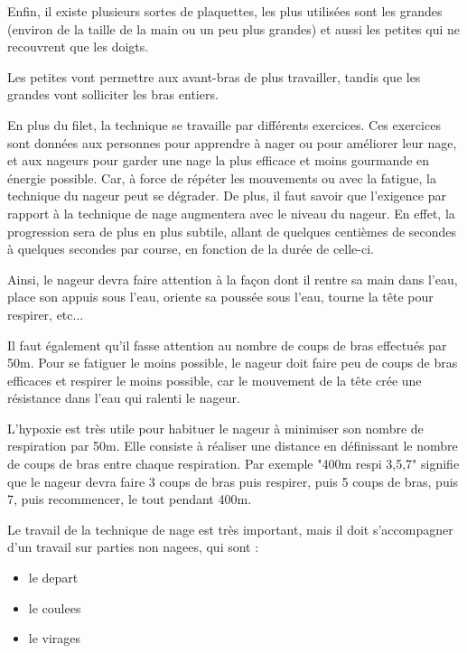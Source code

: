 \vspace{12pt}

Enfin, il existe plusieurs sortes de plaquettes, les plus utilisées sont les grandes (environ de la taille de la main ou un peu plus grandes) et aussi les petites qui ne recouvrent que les doigts.

Les petites vont permettre aux avant-bras de plus travailler, tandis que les grandes vont solliciter les bras entiers.

\vspace{12pt}

En plus du \gls{filet}, la technique se travaille par différents exercices. Ces exercices sont données aux personnes pour apprendre à nager ou pour améliorer leur nage, et aux nageurs pour garder une nage la plus efficace et moins gourmande en énergie possible. Car, à force de répéter les mouvements ou avec la fatigue, la technique du nageur peut se dégrader. De plus, il faut savoir que l'exigence par rapport à la technique de nage augmentera avec le niveau du nageur. En effet, la progression sera de plus en plus subtile, allant de quelques centièmes de secondes à quelques secondes par course, en fonction de la durée de celle-ci.

Ainsi, le nageur devra faire attention à la façon dont il rentre sa main dans l'eau, place son appuis sous l'eau, oriente sa poussée sous l'eau, tourne la tête pour respirer, etc...

Il faut également qu'il fasse attention au nombre de coups de bras effectués par 50m. Pour se fatiguer le moins possible, le nageur doit faire peu de coups de bras efficaces et respirer le moins possible, car le mouvement de la tête crée une résistance dans l'eau qui ralenti le nageur.

\vspace{12pt}

L'hypoxie est très utile pour habituer le nageur à minimiser son nombre de respiration par 50m. Elle consiste à réaliser une distance en définissant le nombre de coups de bras entre chaque respiration. Par exemple "400m respi 3,5,7" signifie que le nageur devra faire 3 coups de bras puis respirer, puis 5 coups de bras, puis 7, puis recommencer, le tout pendant 400m. 

\vspace{12pt}

Le travail de la technique de nage est très important, mais il doit s'accompagner d'un travail sur \gls{parties non nagees}, qui sont :
\begin{itemize}
\item le \gls{depart}
\item le \gls{coulees}
\item le \gls{virages}
\end{itemize}

